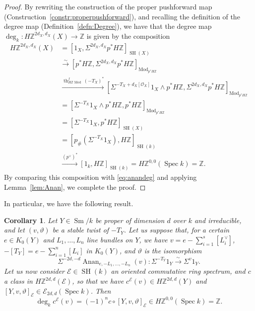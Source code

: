 \documentclass[10pt]{amsart}
\theoremstyle{definition}
\theoremstyle{plain}
\newtheorem{corollary}[defn]{Corollary}
\numberwithin{equation}{section}
\newcommand{\0}{\emptyset}
\newcommand{\sE}{{\mathcal E}}
\newcommand{\sO}{{\mathcal O}}
\newcommand{\Z}{{\mathbb Z}}
\newcommand{\Spec}{{\operatorname{Spec}}}
\newcommand{\SH}{{\operatorname{SH}}}
\newcommand{\Sm}{{\operatorname{Sm}}}
\renewcommand{\th}{{\operatorname{th}}}
\renewcommand{\deg}{{\operatorname{deg}}}
\newcommand{\Mod}{{\operatorname{Mod}}}
\newcommand{\Anan}{{\operatorname{Anan}}}
\begin{document}
\begin{proof} By rewriting the construction of the proper pushforward map (Construction~\ref{constr:properpushforward}), and recalling the definition of the degree map (Definition~\ref{defn:Degree}), we have that the degree map $\deg_k:H\Z^{2d_X, d_X}(X)\to \Z$ is given by the composition
\begin{align*}
H\Z^{2d_X, d_X}(X)&=[1_X, \Sigma^{2d_X, d_X}p^*H\Z]_{\SH(X)}\\
&\xrightarrow{\sim}
[p^*H\Z, \Sigma^{2d_X, d_X}p^*H\Z]_{\Mod_{p^*H\Z}}\\
&\xrightarrow{\th_{H\Z\Mod}^f(-T_X)^*}[\Sigma^{-T_X+d_X[\sO_X]}1_X\wedge p^*H\Z, \Sigma^{2d_X, d_X}p^*H\Z]_{\Mod_{p^*H\Z}}\\
&=[\Sigma^{-T_X}1_X\wedge  p^*H\Z, p^*H\Z]_{\Mod_{p^*H\Z}}\\
&=[\Sigma^{-T_X}1_X, p^*H\Z]_{\SH(X)}\\
&=[p_\#(\Sigma^{-T_X}1_X), H\Z]_{\SH(k)}\\
&\xrightarrow{(p^\vee)^*}[1_k,H\Z]_{\SH(k)}=H\Z^{0,0}(\Spec k)=\Z.
\end{align*}
By comparing this composition with \eqref{eq:anandeg} and applying Lemma~\ref{lem:Anan}, we complete the proof.
\end{proof}

In particular, we have the following result.

\begin{corollary}
\label{cor:TwistClassComp}
Let $Y\in \Sm/k$ be proper of dimension $d$ over $k$ and irreducible, and let $(v,\vartheta)$ be a stable twist of $-T_Y$. Let us suppose that, for a certain $e \in K_0(Y)$ and $L_1, \ldots, L_n$ line bundles on $Y$, we have $v=e-\sum_{i=1}^s[L_i^\vee]$, $-[T_Y]=e-\sum_{i=1}^n[L_i]$ in $K_0(Y)$, and $\vartheta$ is the isomorphism
\[
\Sigma^{-2d,-d}\Anan_{e, -L_1,\ldots, -L_n}(v):\Sigma^{-T_Y}1_Y\xrightarrow{\sim} \Sigma^v1_Y.
\]
Let us now consider $\sE \in \SH(k)$ an oriented commutative ring spectrum, and $c$ a class in $H\Z^{2d,d}(\sE)$, so that we have $c^\sE(v)\in H\Z^{2d,d}(Y)$ and $[Y,v,\vartheta]_\sE\in \sE_{2d,d}(\Spec k)$.
Then 
\[
\deg_k c^\sE(v)=(-1)^n c\circ [Y,v,\vartheta]_\sE\in H\Z^{0,0}(\Spec k)=\Z.
\]
\end{corollary}
\end{document}
